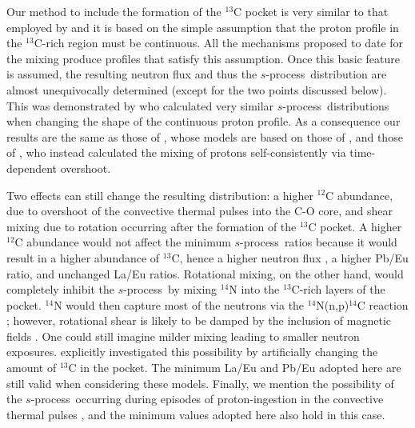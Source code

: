 \documentclass{emulateapj}
\def\spro{\mbox{$s$-process}}
\begin{document}
Our method to include the formation of the $^{13}$C pocket 
is very similar to that employed by \citet{goriely00}
and it is based on the simple assumption 
that the proton profile in the $^{13}$C-rich region must be continuous. 
All the mechanisms proposed to date for the mixing 
produce profiles that satisfy this assumption. 
Once this basic feature is assumed, 
the resulting neutron flux and thus the \spro\ distribution 
are almost unequivocally determined 
(except for the two points discussed below).
This was demonstrated by \citet{goriely00} 
who calculated very similar \spro\ distributions 
when changing the shape of the continuous proton profile. 
As a consequence our results are the same as those of 
\citet{vaneck03}, whose models
are based on those of \citet{goriely00}, and those of 
\citet{cristallo09a}, who instead calculated the mixing of 
protons self-consistently via time-dependent overshoot.

Two effects can still change the resulting distribution: 
a higher $^{12}$C abundance, due to overshoot of the 
convective thermal pulses into the C-O core, 
and shear mixing due to rotation occurring 
after the formation of the $^{13}$C pocket. 
A higher $^{12}$C abundance 
would not affect the minimum \spro\ ratios 
because it would result in a higher abundance of $^{13}$C, 
hence a higher neutron flux \citep{lugaro03}, 
a higher Pb/Eu ratio, and unchanged La/Eu ratios. 
Rotational mixing, on the other hand, would completely inhibit 
the \spro\ by mixing $^{14}$N into the $^{13}$C-rich layers of the pocket. 
$^{14}$N would then capture most of the neutrons via the 
$^{14}$N(n,p)$^{14}$C reaction \citep{herwig03,siess04};
however, rotational shear is likely to be damped 
by the inclusion of magnetic fields \citep{suijs08}.
One could still imagine milder mixing leading to smaller neutron exposures. 
\citet{bisterzo10} explicitly investigated this possibility 
by artificially changing the amount of $^{13}$C in the pocket. 
The minimum La/Eu and Pb/Eu adopted here are still valid 
when considering these models. 
Finally, we mention the possibility of the \spro\
occurring during episodes of proton-ingestion 
in the convective thermal pulses 
\citep{cristallo09b}, and 
the minimum values adopted here also hold in this case.
\end{document}
